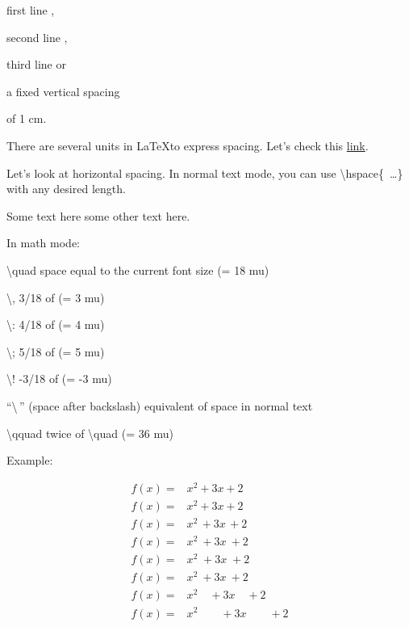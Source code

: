 \documentclass{article}
\begin{document}
first line \smallskip,

second line \medskip, 

third line \bigskip or

a fixed vertical spacing \vspace{1cm}

of 1 cm. %

\vspace{0.5cm}

There are several units in \LaTeX to express spacing. Let's check this \href{https://www.overleaf.com/learn/latex/Lengths_in_LaTeX}{link}.

\vspace{\baselineskip}

Let's look at horizontal spacing. In normal text mode, you can use \mbox{\textbackslash hspace\{ \dots \}} with any desired length. 

Some text here \hspace{2cm} some other text here.

In math mode:

\textbackslash quad	space equal to the current font size (= 18 mu)

\textbackslash,	3/18 of \quad (= 3 mu)

\textbackslash:	4/18 of \quad (= 4 mu)

\textbackslash;	5/18 of \quad (= 5 mu)

\textbackslash!	-3/18 of \quad (= -3 mu)

``\textbackslash \,'' (space after backslash)	equivalent of space in normal text

\textbackslash qquad	twice of \textbackslash quad (= 36 mu)

\vspace{\baselineskip}

Example:

\begin{align}\label{SpacingExample}
f(x) =& x^2\! +3x\! +2 \\
f(x) =& x^2+3x+2 \\
f(x) =& x^2\, +3x\, +2 \\
f(x) =& x^2\: +3x\: +2 \\
f(x) =& x^2\; +3x\; +2 \\
f(x) =& x^2\ +3x\ +2 \\
f(x) =& x^2\quad +3x\quad +2 \\
f(x) =& x^2\qquad +3x\qquad +2
\end{align}
\end{document}

